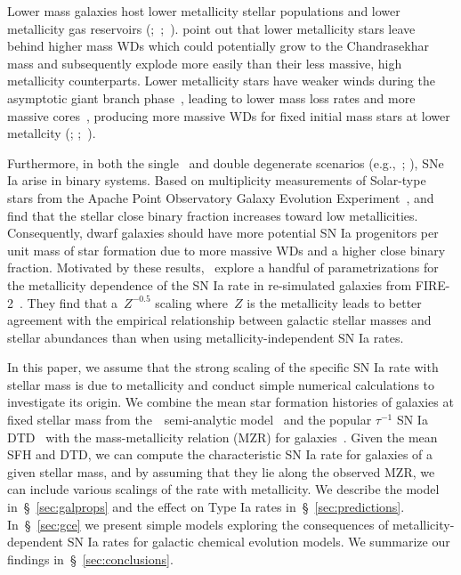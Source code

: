 \documentclass[foo.tex]{subfiles}
\begin{document}
Lower mass galaxies host lower metallicity stellar populations
\citep{Gallazzi2005, Kirby2013} and lower metallicity gas reservoirs
(\citealp{Tremonti2004};~\citealp*{Zahid2011};~\citealp{Andrews2013,
Zahid2014}).
\citet{Kistler2013} point out that lower metallicity stars leave behind higher
mass WDs which could potentially grow to the Chandrasekhar mass and
subsequently explode more easily than their less massive, high metallicity
counterparts.
Lower metallicity stars have weaker winds during the asymptotic giant branch
phase~\citep{Willson2000, Marigo2007}, leading to lower mass loss rates and
more massive cores~\citep{Kalirai2014}, producing more massive WDs for fixed
initial mass stars at lower metallcity (\citealp{Umeda1999};
\citealp*{Meng2008};~\citealp{Zhao2012}).
\par
Furthermore, in both the single~\citep[e.g.,][]{Whelan1973} and double
degenerate scenarios (e.g.,~\mbox{\citealp{Iben1984}};
\mbox{\citealp{Webbink1984}}), SNe Ia arise in binary systems.
Based on multiplicity measurements of Solar-type stars from the Apache Point
Observatory Galaxy Evolution Experiment~\citep[APOGEE;][]{Majewski2017},
\citet{Badenes2018} and~\citet*{Moe2019} find that the stellar close binary
fraction increases toward low metallicities.
Consequently, dwarf galaxies should have more potential SN Ia progenitors per
unit mass of star formation due to more massive WDs and a higher close binary
fraction.
Motivated by these results,~\citet{Gandhi2022} explore a handful of
parametrizations for the metallicity dependence of the SN Ia rate in
re-simulated galaxies from FIRE-2~\citep{Hopkins2018}.
They find that a~$Z^{-0.5}$ scaling where~$Z$ is the metallicity leads
to better agreement with the empirical relationship between galactic stellar
masses and stellar abundances than when using metallicity-independent SN Ia
rates.
\par
In this paper, we assume that the strong scaling of the specific SN Ia rate
with stellar mass is due to metallicity and conduct simple numerical
calculations to investigate its origin.
We combine the mean star formation histories of galaxies at fixed stellar
mass from the~\um~semi-analytic model~\citep{Behroozi2019} and the popular
$\tau^{-1}$ SN Ia DTD~\citep[e.g.,][]{Maoz2012a} with the mass-metallicity
relation (MZR) for galaxies~\citep{Tremonti2004, Andrews2013, Zahid2011,
Zahid2014}.
Given the mean SFH and DTD, we can compute the characteristic SN Ia rate for
galaxies of a given stellar mass, and by assuming that they lie along the
observed MZR, we can include various scalings of the rate with metallicity.
We describe the model in~\S~\ref{sec:galprops} and the effect on Type Ia rates
in~\S~\ref{sec:predictions}.
In~\S~\ref{sec:gce} we present simple models exploring the consequences of
metallicity-dependent SN Ia rates for galactic chemical evolution models.
We summarize our findings in~\S~\ref{sec:conclusions}.
\end{document}
